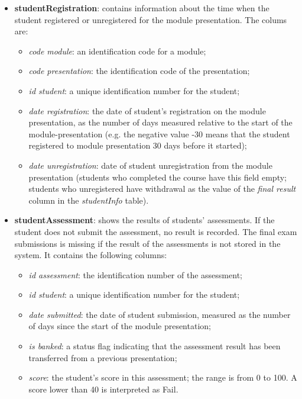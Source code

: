 \documentclass{article}
\begin{document}
\begin{itemize}
    \item \textbf{studentRegistration}: contains information about the time when the student registered or unregistered for the module presentation. The colums are:
    \begin{itemize}
        \item \textit{code module}: an identification code for a module;
        \item \textit{code presentation}: the identification code of the presentation;
        \item \textit{id student}: a unique identification number for the student;
        \item \textit{date registration}: the date of student’s registration on the module presentation, as the number of days measured relative to the start of the module-presentation (e.g. the negative value -30 means that the student registered to module presentation 30 days before it started);
        \item \textit{date unregistration}: date of student unregistration from the module presentation (students  who completed the course have this field empty; students who unregistered have withdrawal as the value of the \textit{final result} column in the \textit{studentInfo} table).
    \end{itemize}

    \item \textbf{studentAssessment}: shows the results of students’ assessments. If the student does not submit the assessment, no result is recorded. The final exam submissions is missing if the result of the assessments is not stored in the system. It contains the following columns:
    \begin{itemize}
        \item \textit{id assessment}: the identification number of the assessment;
        \item \textit{id student}: a unique identification number for the student;
        \item \textit{date submitted}: the date of student submission, measured as the number of days since the start of the module presentation;
        \item \textit{is banked}: a status flag indicating that the assessment result has been transferred from a previous presentation;
        \item \textit{score}: the student’s score in this assessment; the range is from 0 to 100. A score lower than 40 is interpreted as Fail.
    \end{itemize}


\end{itemize}
\end{document}
